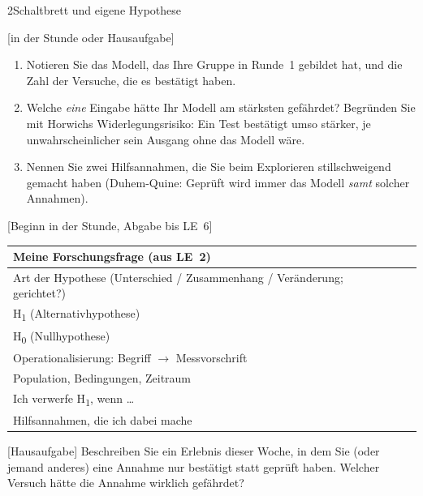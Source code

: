 \begin{uebungsblattb}{2}{Schaltbrett und eigene Hypothese}

[in der Stunde oder Hausaufgabe]
\begin{enumerate}
  \item Notieren Sie das Modell, das Ihre Gruppe in Runde~1 gebildet hat,
    und die Zahl der Versuche, die es bestätigt haben.
  \item Welche \emph{eine} Eingabe hätte Ihr Modell am stärksten
    gefährdet? Begründen Sie mit Horwichs Widerlegungsrisiko: Ein Test
    bestätigt umso stärker, je unwahrscheinlicher sein Ausgang ohne das
    Modell wäre.
  \item Nennen Sie zwei Hilfsannahmen, die Sie beim Explorieren
    stillschweigend gemacht haben (Duhem-Quine: Geprüft wird immer das
    Modell \emph{samt} solcher Annahmen).
\end{enumerate}

[Beginn in der Stunde, Abgabe bis LE~6]
\begin{center}
\renewcommand{\arraystretch}{1.6}
\begin{tabular}{|p{}|p{}|}
\hline
Meine Forschungsfrage (aus LE~2) & \\[6mm] \hline
Art der Hypothese (Unterschied / Zusammenhang / Veränderung; gerichtet?) & \\ \hline
H\textsubscript{1} (Alternativhypothese) & \\[8mm] \hline
H\textsubscript{0} (Nullhypothese) & \\[8mm] \hline
Operationalisierung: Begriff $\to$ Messvorschrift & \\[8mm] \hline
Population, Bedingungen, Zeitraum & \\ \hline
Ich verwerfe H\textsubscript{1}, wenn \ldots & \\[8mm] \hline
Hilfsannahmen, die ich dabei mache & \\[6mm] \hline
\end{tabular}
\end{center}

[Hausaufgabe]
Beschreiben Sie ein Erlebnis dieser Woche, in dem Sie (oder jemand
anderes) eine Annahme nur bestätigt statt geprüft haben. Welcher Versuch
hätte die Annahme wirklich gefährdet?


\end{uebungsblattb}

